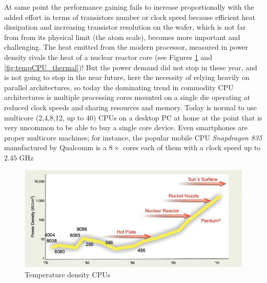 At same point the performance gaining fails to increase proportionally with the added effort in terms of transistors number or clock speed because efficient heat dissipation and increasing transistor resolution on the wafer, which is not far from from its physical limit (the atom scale),  becomes more important and challenging.
The heat emitted from the modern processor, measured in power density rivals the heat of a nuclear reactor core (see Figures \ref{fig:tempCPU} and \ref{fig:tempCPU_thermal})!
But the power demand did not stop in these year, and is not going to stop in the near future, here the necessity of relying heavily on parallel architectures, so today the dominating trend in commodity CPU architectures is multiple processing cores mounted on a single die operating at reduced clock speeds and sharing resources and memory. Today is normal to use multicore (2,4,8,12, up to 40) CPUs on a desktop PC at home at the point that is very uncommon to be able to buy a single core device.
Even smartphones are proper multicore machines; for instance, the popular mobile CPU \textit{Snapdragon 835} manufactured by Qualcomm is a $8 \times$ cores each of them with a clock speed up to $2.45$ GHz

\begin{figure}
\centering
\includegraphics[scale=0.7]{./images/parallel_programming/temperatureCPU}
\caption{Temperature density CPUs}\label{fig:tempCPU}
\end{figure}

